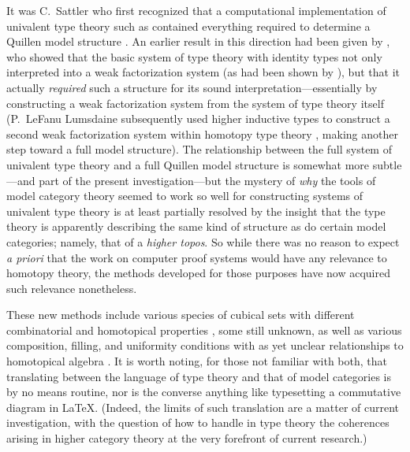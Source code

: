 \documentclass[11pt,reqno]{amsart}
\theoremstyle{remark}
\theoremstyle{definition}
\begin{document}
It was C.~Sattler who first recognized that a computational implementation of univalent type theory such as \cite{CCHM:2018ctt} contained everything required to determine a Quillen model structure \cite{Sattler:2017ee}. An earlier result in this direction had been given by \cite{gambino-garner:idtypewfs}, who showed that the basic system of type theory with identity types not only interpreted into a weak factorization system (as had been shown by \cite{awodey-warren:homotopy-idtype}), but that it actually \emph{required} such a structure for its sound interpretation---essentially by constructing a weak factorization system from the system of type theory itself (P.~LeFanu Lumsdaine subsequently used higher inductive types to construct a second weak factorization system within homotopy type theory \cite{Lumsdaine:HITCofibrations}, making another step toward a full model structure).  The relationship between the full system of univalent type theory and a full Quillen model structure is somewhat more subtle---and part of the present investigation---but the mystery of \emph{why} the tools of model category theory seemed to work so well for constructing systems of univalent type theory is at least partially resolved by the insight that the type theory is apparently describing the same  kind of structure as do certain model categories; namely, that of a \emph{higher topos}. 
So while there was no reason to expect \emph{a priori} that the work on computer proof systems 
would have any relevance to homotopy theory, the methods developed for those purposes have now acquired such relevance nonetheless. 

These new methods include various species of cubical sets with different combinatorial and homotopical properties \cite{BuchholtzMoorehouse}, some still unknown, as well as various composition, filling, and uniformity conditions with as yet unclear relationships to homotopical algebra \cite{orton-pitts,CCHM:2018ctt,BCH,ABCHFL,CMS:2020}. It is worth noting, for those not familiar with both, that translating between the language of type theory and that of model categories is by no means routine, nor is the converse anything like typesetting a commutative diagram in LaTeX.  (Indeed, the limits of such translation are a matter of current investigation, with the question of how to handle in type theory the coherences arising in higher category theory at the very forefront of current research.) 
\end{document}
